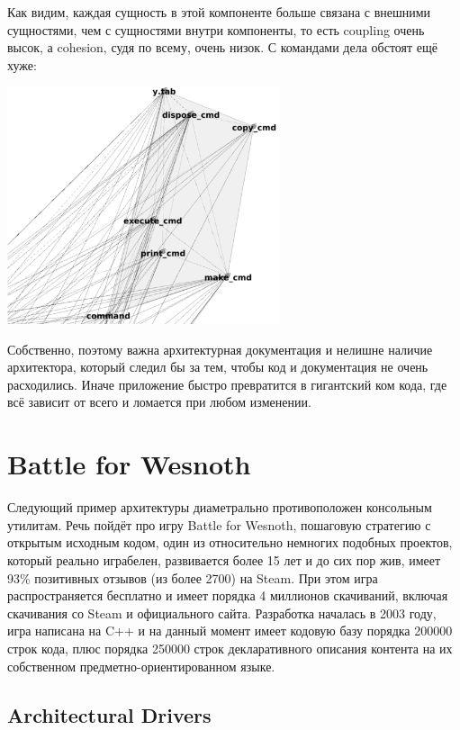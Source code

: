 \documentclass[a5paper]{article}
\begin{document}
Как видим, каждая сущность в этой компоненте больше связана с внешними сущностями, чем с сущностями внутри компоненты, то есть coupling очень высок, а cohesion, судя по всему, очень низок. С командами дела обстоят ещё хуже:

\begin{center}
    \includegraphics[width=0.6\textwidth]{bashCommands.png}
\end{center}

Собственно, поэтому важна архитектурная документация и нелишне наличие архитектора, который следил бы за тем, чтобы код и документация не очень расходились. Иначе приложение быстро превратится в гигантский ком кода, где всё зависит от всего и ломается при любом изменении.

\section{Battle for Wesnoth}

Следующий пример архитектуры диаметрально противоположен консольным утилитам. Речь пойдёт про игру Battle for Wesnoth, пошаговую стратегию с открытым исходным кодом, один из относительно немногих подобных проектов, который реально играбелен, развивается более 15 лет и до сих пор жив, имеет 93\% позитивных отзывов (из более 2700) на Steam. При этом игра распространяется бесплатно и имеет порядка 4 миллионов скачиваний, включая скачивания со Steam и официального сайта. Разработка началась в 2003 году, игра написана на C++ и на данный момент имеет кодовую базу порядка 200000 строк кода, плюс порядка 250000 строк декларативного описания контента на их собственном предметно-ориентированном языке.

\subsection{Architectural Drivers}
\end{document}
